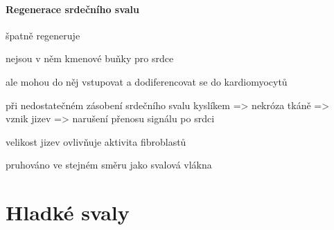 \documentclass[DIV=8]{scrreprt}
\begin{document}
\paragraph{Regenerace srdečního svalu}
\begin{myItemize}[nosep]
    \item špatně regeneruje
    \item nejsou v něm kmenové buňky pro srdce
\begin{myItemize}[nosep]
    \item ale mohou do něj vstupovat a dodiferencovat se do kardiomyocytů
\end{myItemize}

    \item při nedostatečném zásobení srdečního svalu kyslíkem => nekróza tkáně => vznik jizev => narušení přenosu signálu po srdci
\begin{myItemize}[nosep]
    \item velikost jizev ovlivňuje aktivita fibroblastů
\end{myItemize}

    \item pruhováno ve stejném směru jako svalová vlákna
\end{myItemize}



\section{Hladké svaly} \label{Hladké svaly} \FloatBarrier
\end{document}
